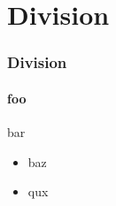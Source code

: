\section{Division}
\begin{frame}
  \frametitle{Division}
  \framesubtitle{foo}
  bar\cite{watt2023efficient}
        \begin{itemize}
            \item baz
                \pause
              \item qux
        \end{itemize}
\end{frame}
